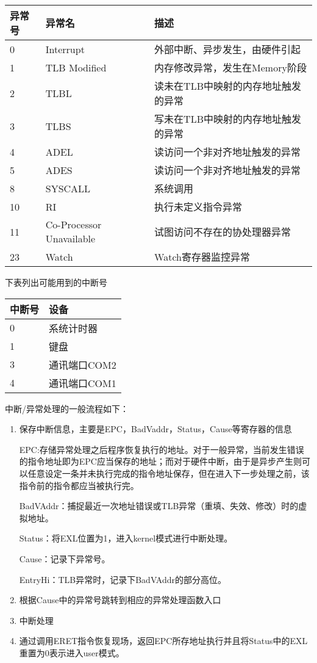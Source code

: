 \begin{table}[H]
\centering
\begin{tabular}{lll}
\hline
异常号&异常名&描述\\
\hline
0&Interrupt&外部中断、异步发生，由硬件引起\\
1&TLB Modified&内存修改异常，发生在Memory阶段\\
2&TLBL&读未在TLB中映射的内存地址触发的异常\\
3&TLBS&写未在TLB中映射的内存地址触发的异常\\
4&ADEL&读访问一个非对齐地址触发的异常\\
5&ADES&读访问一个非对齐地址触发的异常\\
8&SYSCALL&系统调用\\
10&RI&执行未定义指令异常\\
11&Co-Processor Unavailable&试图访问不存在的协处理器异常\\
23&Watch&Watch寄存器监控异常\\
\hline
\end{tabular}
\end{table}

下表列出可能用到的中断号

\begin{table}[H]
\centering
\begin{tabular}{ll}
\hline
中断号&设备\\
\hline
0&系统计时器\\
1&键盘\\
3&通讯端口COM2\\
4&通讯端口COM1\\
\hline
\end{tabular}
\end{table}

中断/异常处理的一般流程如下：

\begin{enumerate}[(1)]
\item 保存中断信息，主要是EPC，BadVaddr，Status，Cause等寄存器的信息

\qquad EPC:存储异常处理之后程序恢复执行的地址。对于一般异常，当前发生错误的指令地址即为EPC应当保存的地址；而对于硬件中断，由于是异步产生则可以任意设定一条并未执行完成的指令地址保存，但在进入下一步处理之前，该指令前的指令都应当被执行完。

\qquad BadVAddr：捕捉最近一次地址错误或TLB异常（重填、失效、修改）时的虚拟地址。

\qquad Status：将EXL位置为1，进入kernel模式进行中断处理。

\qquad Cause：记录下异常号。

\qquad EntryHi：TLB异常时，记录下BadVAddr的部分高位。

\item 根据Cause中的异常号跳转到相应的异常处理函数入口

\item 中断处理

\item 通过调用ERET指令恢复现场，返回EPC所存地址执行并且将Status中的EXL重置为0表示进入user模式。

\end{enumerate}

